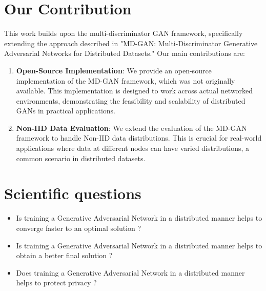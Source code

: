 \section{Our Contribution}
This work builds upon the multi-discriminator GAN framework, specifically extending the approach described in "MD-GAN: Multi-Discriminator Generative Adversarial Networks for Distributed Datasets." \cite{mdgan} Our main contributions are:
\begin{enumerate}
    \item \textbf{Open-Source Implementation}: We provide an open-source implementation of the MD-GAN framework, which was not originally available. This implementation is designed to work across actual networked environments, demonstrating the feasibility and scalability of distributed GANs in practical applications.
    \item \textbf{Non-IID Data Evaluation}: We extend the evaluation of the MD-GAN framework to handle Non-IID data distributions. This is crucial for real-world applications where data at different nodes can have varied distributions, a common scenario in distributed datasets.
\end{enumerate}

\newpage

\section{Scientific questions}
\begin{itemize}
    \item Is training a Generative Adversarial Network in a distributed manner helps to converge faster to an optimal solution ?
    \item Is training a Generative Adversarial Network in a distributed manner helps to obtain a better final solution ?
    \item Does training a Generative Adversarial Network in a distributed manner helps to protect privacy ?
\end{itemize}
